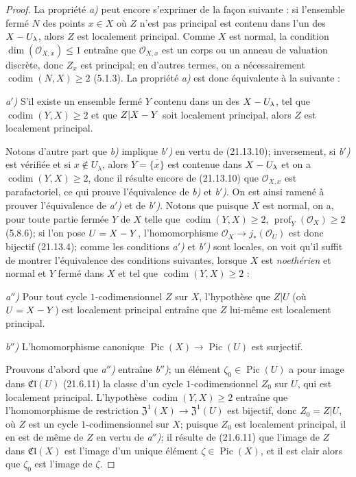 \begin{proof}
La propriété \emph{a)} peut encore s'exprimer de la façon suivante : si l'ensemble fermé
$N$ des points $x\in X$ où $Z$ n'est pas principal est contenu dans l'un des
$X- U_\lambda$, alors $Z$ est localement principal. Comme $X$ est normal, la condition
$\dim(\mathcal O_{X,x})\leq1$ entraîne que $\mathcal O_{X,x}$ est un corps ou un
anneau de valuation discrète, donc $Z_x$ est principal; en d'autres termes, on a
nécessairement $\operatorname{codim}(N,X)\geq2$ (5.1.3). La propriété \emph{a)} est donc
équivalente à la suivante :

\emph{a$'$)} S'il existe un ensemble fermé $Y$ contenu dans un des $X- U_\lambda$, tel
que $\operatorname{codim}(Y,X)\geq2$ et que $Z|X- Y$ soit localement principal,
alors $Z$ est localement principal.

Notons d'autre part que \emph{b)} implique \emph{b$'$)} en vertu de (21.13.10); inversement, si
\emph{b$'$)} est vérifiée et si $x\notin U_\lambda$, alors $Y=\overline{\{x\}}$ est contenue dans
$X- U_\lambda$ et on a $\operatorname{codim}(Y,X)\geq2$, donc il résulte encore de
(21.13.10) que $\mathcal O_{X,x}$ est parafactoriel, ce qui prouve l'équivalence de
\emph{b)} et \emph{b$'$)}. On est ainsi ramené à prouver l'équivalence de \emph{a$'$)} et de \emph{b$'$)}.
Notons que puisque $X$ est normal, on a, pour toute partie fermée $Y$ de $X$ telle que
$\operatorname{codim}(Y,X)\geq2$, $\operatorname{prof}_Y(\mathcal O_X)\geq2$
(5.8.6); si l'on pose $U=X- Y$, l'homomorphisme
$\mathcal O_X\to j_*(\mathcal O_U)$ est donc bijectif (21.13.4); comme les conditions
\emph{a$'$)} et \emph{b$'$)} sont locales, on voit qu'il suffit de montrer l'équivalence des
conditions suivantes, lorsque $X$ est \emph{noethérien} et normal et $Y$ fermé dans $X$ et
tel que $\operatorname{codim}(Y,X)\geq2$ :

\emph{a$''$)} Pour tout cycle $1$-codimensionnel $Z$ sur $X$, l'hypothèse que $Z|U$
(où $U=X- Y$) est localement principal entraîne que $Z$ lui-même est localement
principal.

\emph{b$''$)} L'homomorphisme canonique
$\operatorname{Pic}(X)\to\operatorname{Pic}(U)$ est surjectif.

Prouvons d'abord que \emph{a$''$)} entraîne \emph{b$''$)}; un élément
$\zeta_0\in\operatorname{Pic}(U)$ a pour image dans $\mathfrak{Cl}(U)$ (21.6.11) la
classe d'un cycle $1$-codimensionnel $Z_0$ sur $U$, qui est localement principal.
L'hypothèse $\operatorname{codim}(Y,X)\geq2$ entraîne que l'homomorphisme de
restriction $\mathfrak{Z}^1(X)\to\mathfrak{Z}^1(U)$ est bijectif, donc $Z_0=Z|U$, où $Z$
est un cycle $1$-codimensionnel sur $X$; puisque $Z_0$ est localement principal, il en
est de même de $Z$ en vertu de \emph{a$''$)}; il résulte de (21.6.11) que l'image de $Z$ dans
$\mathfrak{Cl}(X)$ est l'image d'un unique élément $\zeta\in\operatorname{Pic}(X)$,
et il est clair alors que $\zeta_0$ est l'image de $\zeta$.


\end{proof}
